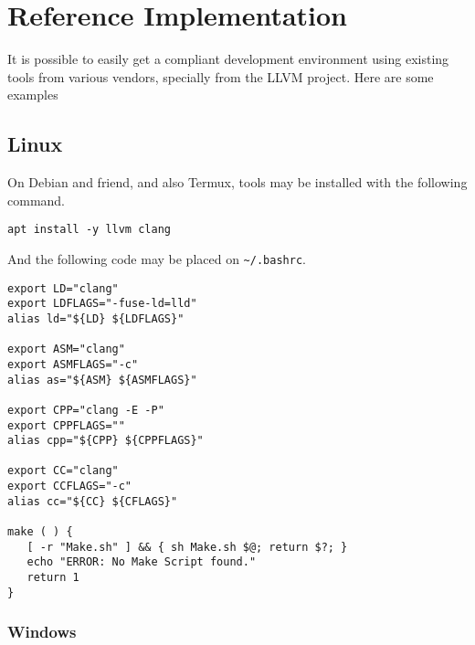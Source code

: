 \chapter{Reference Implementation}

It is possible to easily get a compliant development environment
using existing tools from various vendors,
specially from the LLVM \cite{LLVM} project.
Here are some examples

\section{Linux}

On Debian and friend, and also Termux,
tools may be installed with the following command.

\begin{lstlisting}[style=sh]
apt install -y llvm clang
\end{lstlisting}

And the following code may be placed on \texttt{\textasciitilde/.bashrc}.

\begin{lstlisting}[style=sh]
export LD="clang"
export LDFLAGS="-fuse-ld=lld"
alias ld="${LD} ${LDFLAGS}"

export ASM="clang"
export ASMFLAGS="-c"
alias as="${ASM} ${ASMFLAGS}"

export CPP="clang -E -P"
export CPPFLAGS=""
alias cpp="${CPP} ${CPPFLAGS}"

export CC="clang"
export CCFLAGS="-c"
alias cc="${CC} ${CFLAGS}"

make ( ) {
   [ -r "Make.sh" ] && { sh Make.sh $@; return $?; }
   echo "ERROR: No Make Script found."
   return 1
}
\end{lstlisting}

\subsection{Windows}
